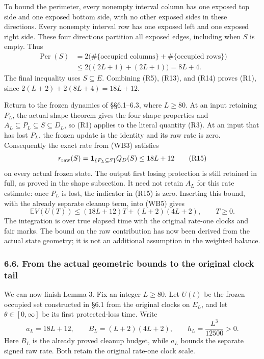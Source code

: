 \documentclass[
  11pt,
  a4paper,
]{article}
\begin{document}
To bound the perimeter, every nonempty interval column has one exposed
top side and one exposed bottom side, with no other exposed sides in
these directions. Every nonempty interval row has one exposed left and
one exposed right side. These four directions partition all exposed
edges, including when \(S\) is empty. Thus \[
\begin{aligned}
\operatorname{Per}(S)
 &=2\bigl(\#\{\text{occupied columns}\}+\#\{\text{occupied rows}\}\bigr)\\
 &\leq2\bigl((2L+1)+(2L+1)\bigr)=8L+4.
\end{aligned}
\tag{R14}
\] The final inequality uses \(S\subseteq E\). Combining (R5), (R13),
and (R14) proves (R1), since \(2(L+2)+2(8L+4)=18L+12\).

Return to the frozen dynamics of §§6.1--6.3, where \(L\geq80\). At an
input retaining \(P_L\), the actual shape theorem gives the four shape
properties and \(A_L\subseteq P_L\subseteq S\subseteq D_L\), so (R1)
applies to the literal quantity (R3). At an input that has lost \(P_L\),
the frozen update is the identity and its raw rate is zero. Consequently
the exact rate from (WB3) satisfies \[
r_{\rm raw}(S)=\mathbf1_{\{P_L\subseteq S\}}Q_D(S)\leq18L+12
\tag{R15}
\] on every actual frozen state. The output first losing protection is
still retained in full, as proved in the shape subsection. It need not
retain \(A_L\) for this rate estimate: once \(P_L\) is lost, the
indicator in (R15) is zero. Inserting this bound, with the already
separate cleanup term, into (WB5) gives \[
\mathbb E V(U(T))\leq(18L+12)T+(L+2)(4L+2),\qquad T\geq0.
\tag{R16}
\] The integration is over true elapsed time with the original rate-one
clocks and fair marks. The bound on the raw contribution has now been
derived from the actual state geometry; it is not an additional
assumption in the weighted balance.

\subsubsection{6.6. From the actual geometric bounds to the original
clock
tail}\label{from-the-actual-geometric-bounds-to-the-original-clock-tail}

We can now finish Lemma 3. Fix an integer \(L\geq80\). Let \(U(t)\) be
the frozen occupied set constructed in §6.1 from the original clocks on
\(E_L\), and let \(\theta\in[0,\infty]\) be its first protected-loss
time. Write \[
a_L=18L+12,\qquad B_L=(L+2)(4L+2),\qquad h_L=\frac{L^3}{12500}>0.
\tag{LT1}
\] Here \(B_L\) is the already proved cleanup budget, while \(a_L\)
bounds the separate signed raw rate. Both retain the original rate-one
clock scale.
\end{document}
